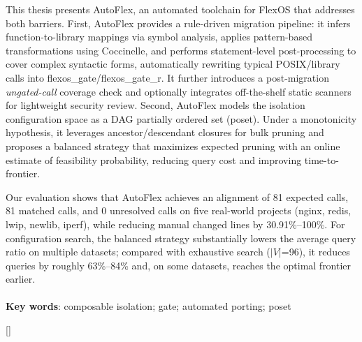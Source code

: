 \documentclass[UTF8,a4paper,12pt,twoside]{ctexart}  %
\begin{document}
This thesis presents AutoFlex, an automated toolchain for
FlexOS that addresses both barriers. First, AutoFlex provides a
rule-driven migration pipeline: it infers function-to-library mappings
via symbol analysis, applies pattern-based transformations using
Coccinelle, and performs statement-level post-processing to cover
complex syntactic forms, automatically rewriting typical POSIX/library
calls into flexos\_gate/flexos\_gate\_r. It further introduces a
post-migration \emph{ungated-call} coverage check and optionally
integrates off-the-shelf static scanners for lightweight security
review. Second, AutoFlex models the isolation configuration space as a
DAG partially ordered set (poset). Under a monotonicity hypothesis, it
leverages ancestor/descendant closures for bulk pruning and proposes a
balanced strategy that maximizes expected pruning with an online
estimate of feasibility probability, reducing query cost and improving
time-to-frontier.

Our evaluation shows that AutoFlex achieves an alignment of 81 expected
calls, 81 matched calls, and 0 unresolved calls on five real-world
projects (nginx, redis, lwip, newlib, iperf), while reducing manual
changed lines by 30.91\%--100\%. For configuration search, the balanced
strategy substantially lowers the average query ratio on multiple
datasets; compared with exhaustive search ($|V|$=96), it
reduces queries by roughly 63\%--84\% and, on some datasets, reaches the
optimal frontier earlier.\\
~\\
\textbf{Key words}: composable isolation; gate; automated porting; poset

\cleardoublepage

\newpage
{}

\renewcommand\contentsname{{目\quad 录}}

\begin{center}
  {\tableofcontents
    \thispagestyle{fancy}
  }
\end{center}

\newpage
{}
\renewcommand{\sectionmark}[1]{\markright{\thesection\quad #1}}

[]
\end{document}
